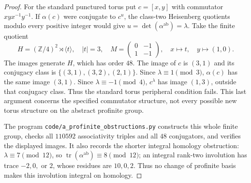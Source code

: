 \begin{proof}
For the standard punctured torus put $c=[x,y]$ with commutator
$xyx^{-1}y^{-1}$. If $\alpha(c)$ were conjugate to $c^u$, the
class-two Heisenberg quotients modulo every positive integer
would give $u=\det(\alpha^{\mathrm{ab}})=\lambda$.
Take the finite quotient
\[
 H=(\mathbb Z/4)^2\rtimes\langle t\rangle,
 \quad |t|=3,\quad
 M=\begin{pmatrix}0&-1\\1&-1\end{pmatrix},
 \quad x\mapsto t,\quad y\mapsto(1,0).
\]
The images generate $H$, which has order $48$. The image of $c$
is $(3,1)$ and its conjugacy class is
$\{(3,1),(3,2),(2,1)\}$. Since $\lambda\equiv1\pmod3$,
$\alpha(c)$ has the same image $(3,1)$. Since
$\lambda\equiv-1\pmod4$, $c^\lambda$ has image
$(1,3)$, outside that conjugacy class. Thus the standard torus
peripheral condition fails. This last argument concerns the
specified commutator structure, not every possible new torus
structure on the abstract profinite group.

The program \texttt{code/a\_profinite\_obstructions.py}
constructs this whole finite group, checks all $110592$
associativity triples and all $48$ conjugators, and verifies
the displayed images. It also records the shorter integral
homology obstruction: $\lambda\equiv7\pmod{12}$, so
$\operatorname{tr}(\alpha^{\mathrm{ab}})\equiv8\pmod{12}$;
an integral rank-two involution has trace $-2,0,$ or $2$, whose
residues are $10,0,2$. Thus no change of profinite basis makes
this involution integral on homology.
\end{proof}


